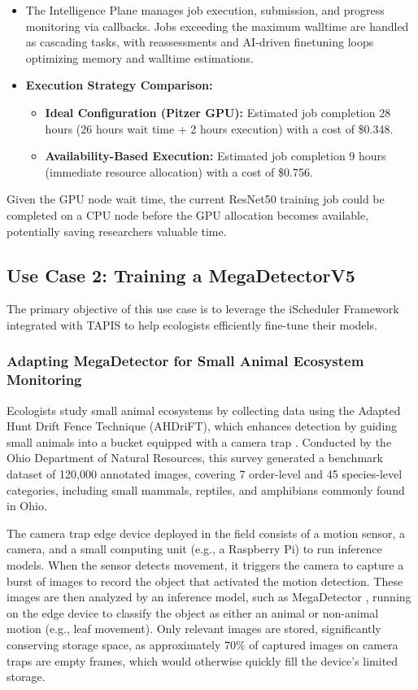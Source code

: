 \begin{itemize}
    \item The Intelligence Plane manages job execution, submission, and progress monitoring via callbacks. Jobs exceeding the maximum walltime are handled as cascading tasks, with reassessments and AI-driven finetuning loops optimizing memory and walltime estimations.
    \item \textbf{Execution Strategy Comparison:}
    \begin{itemize}
        \item \textbf{Ideal Configuration (Pitzer GPU):} Estimated job completion 28 hours (26 hours wait time + 2 hours execution) with a cost of \$0.348.
        \item \textbf{Availability-Based Execution:} Estimated job completion 9 hours (immediate resource allocation) with a cost of \$0.756.
    \end{itemize}
\end{itemize}

Given the GPU node wait time, the current ResNet50 training job could be completed on a CPU node before the GPU allocation becomes available, potentially saving researchers valuable time.



\subsection{Use Case 2: Training a MegaDetectorV5}
\label{uesecase_trainmegadetector}
The primary objective of this use case is to leverage the iScheduler Framework integrated with TAPIS to help ecologists efficiently fine-tune their models.

\subsubsection{Adapting MegaDetector for Small Animal Ecosystem Monitoring}

Ecologists study small animal ecosystems by collecting data using the Adapted Hunt Drift Fence Technique (AHDriFT), which enhances detection by guiding small animals into a bucket equipped with a camera trap \cite{CITE}. Conducted by the Ohio Department of Natural Resources, this survey generated a benchmark dataset of 120,000 annotated images, covering 7 order-level and 45 species-level categories, including small mammals, reptiles, and amphibians commonly found in Ohio.  

The camera trap edge device deployed in the field consists of a motion sensor, a camera, and a small computing unit (e.g., a Raspberry Pi) to run inference models. When the sensor detects movement, it triggers the camera to capture a burst of images to record the object that activated the motion detection. These images are then analyzed by an inference model, such as MegaDetector \cite{CITE}, running on the edge device to classify the object as either an animal or non-animal motion (e.g., leaf movement). Only relevant images are stored, significantly conserving storage space, as approximately 70\% of captured images on camera traps are empty frames, which would otherwise quickly fill the device’s limited storage.  

